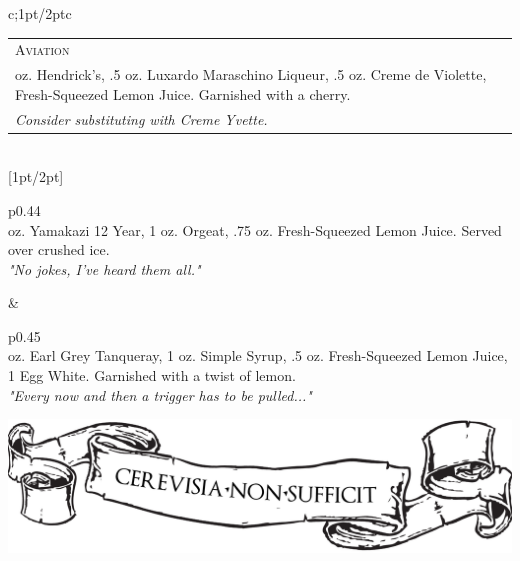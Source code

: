 \documentclass{article}
\begin{document}
\begin{tabular}{c;{1pt/2pt}c}
\begin{tabular}{p{}}
\multicolumn{1}{p{.40\textwidth}}{\centering\huge\textsc{Aviation}}\\ 
   \large\centering 2 oz. Hendrick's, .5 oz. Luxardo Maraschino Liqueur, .5 oz. Creme de Violette, Fresh-Squeezed Lemon Juice. Garnished with a cherry.\\ \normalsize\textit{Consider substituting with Creme Yvette.}
\end{tabular}

\\[1pt/2pt]
\begin{tabular}{p{}}
\\ 
   \large{} oz. Yamakazi 12 Year, 1 oz. Orgeat, .75 oz. Fresh-Squeezed Lemon Juice. Served over crushed ice. \\ \normalsize\textit{"No jokes, I've heard them all."}
 \end{tabular}
&
\begin{tabular}{p{}}
\\ 
   \large{} oz. Earl Grey Tanqueray, 1 oz. Simple Syrup, .5 oz. Fresh-Squeezed Lemon Juice, 1 Egg White. Garnished with a twist of lemon.\\ \normalsize\textit{"Every now and then a trigger has to be pulled..."}
\end{tabular}
\end{tabular}
\includegraphics{logo.png}
\vspace{-.5in}
\end{document}
